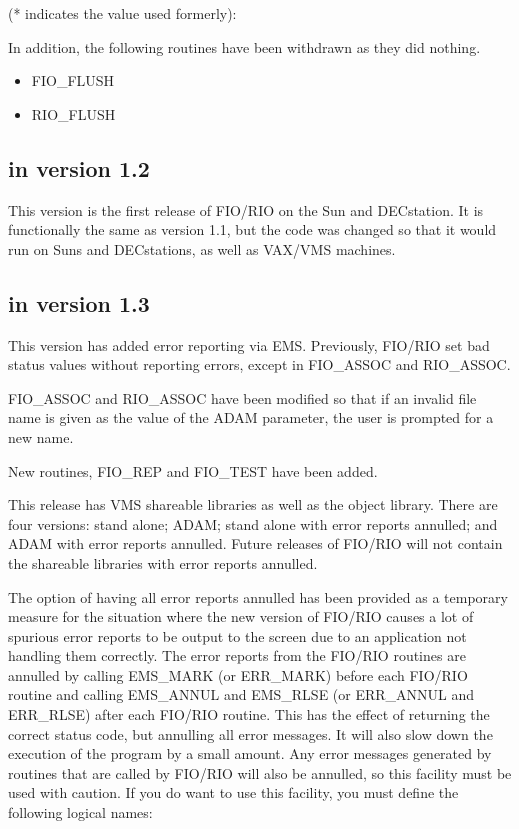 (* indicates the value used formerly):

In addition, the following routines have been withdrawn as they did nothing.

\begin{itemize}
\item FIO\_FLUSH   
\item RIO\_FLUSH
\end{itemize}

\subsection{in version 1.2}

This version is the first release of FIO/RIO on the Sun and DECstation. It is
functionally the same as version 1.1, but the code was changed so that it would
run on Suns and DECstations, as well as VAX/VMS machines.

\subsection{in version 1.3}

This version has added error reporting via EMS. Previously, FIO/RIO set bad
status values without reporting errors, except in FIO\_ASSOC and RIO\_ASSOC.

FIO\_ASSOC and RIO\_ASSOC have been modified so that if an invalid file name is
given as the value of the ADAM parameter, the user is prompted for a new name.

New routines, FIO\_REP and FIO\_TEST have been added.

This release has VMS shareable libraries as well as the object library. There
are four versions: stand alone; ADAM; stand alone with error reports annulled;
and ADAM with error reports annulled. Future releases of FIO/RIO will not
contain the shareable libraries with error reports annulled.

The option of having all error reports annulled has been provided as a
temporary measure for the situation where the new version of FIO/RIO causes a
lot of spurious error reports to be output to the screen due to an application
not handling them correctly. The error reports from the FIO/RIO routines are
annulled by calling EMS\_MARK (or ERR\_MARK) before each FIO/RIO routine and
calling EMS\_ANNUL and EMS\_RLSE (or ERR\_ANNUL and ERR\_RLSE) after each
FIO/RIO routine. This has the effect of returning the correct status code, but
annulling all error messages. It will also slow down the execution of the
program by a small amount. Any error messages generated by routines that are
called by FIO/RIO will also be annulled, so this facility must be used with
caution. If you do want to use this facility, you must define the following
logical names:

